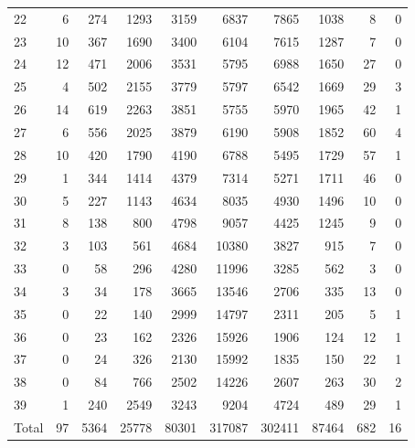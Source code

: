 \begin{table}
\begin{tabular}{lrrrrrrrrr}
22 & 6 & 274 & 1293 & 3159 & 6837 & 7865 & 1038 & 8 & 0 \\
23 & 10 & 367 & 1690 & 3400 & 6104 & 7615 & 1287 & 7 & 0 \\
24 & 12 & 471 & 2006 & 3531 & 5795 & 6988 & 1650 & 27 & 0 \\
25 & 4 & 502 & 2155 & 3779 & 5797 & 6542 & 1669 & 29 & 3 \\
26 & 14 & 619 & 2263 & 3851 & 5755 & 5970 & 1965 & 42 & 1 \\
27 & 6 & 556 & 2025 & 3879 & 6190 & 5908 & 1852 & 60 & 4 \\
28 & 10 & 420 & 1790 & 4190 & 6788 & 5495 & 1729 & 57 & 1 \\
29 & 1 & 344 & 1414 & 4379 & 7314 & 5271 & 1711 & 46 & 0 \\
30 & 5 & 227 & 1143 & 4634 & 8035 & 4930 & 1496 & 10 & 0 \\
31 & 8 & 138 & 800 & 4798 & 9057 & 4425 & 1245 & 9 & 0 \\
32 & 3 & 103 & 561 & 4684 & 10380 & 3827 & 915 & 7 & 0 \\
33 & 0 & 58 & 296 & 4280 & 11996 & 3285 & 562 & 3 & 0 \\
34 & 3 & 34 & 178 & 3665 & 13546 & 2706 & 335 & 13 & 0 \\
35 & 0 & 22 & 140 & 2999 & 14797 & 2311 & 205 & 5 & 1 \\
36 & 0 & 23 & 162 & 2326 & 15926 & 1906 & 124 & 12 & 1 \\
37 & 0 & 24 & 326 & 2130 & 15992 & 1835 & 150 & 22 & 1 \\
38 & 0 & 84 & 766 & 2502 & 14226 & 2607 & 263 & 30 & 2 \\
39 & 1 & 240 & 2549 & 3243 & 9204 & 4724 & 489 & 29 & 1 \\
Total & 97 & 5364 & 25778 & 80301 & 317087 & 302411 & 87464 & 682 & 16 \\
\end{tabular}
\end{table}
